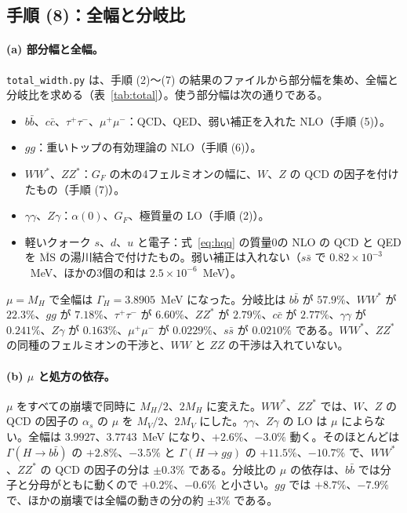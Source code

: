 \documentclass[a4paper,10pt]{ltjsarticle}
\newcommand{\MSbar}{\overline{\mathrm{MS}}}
\begin{document}
\subsection{手順 (8)：全幅と分岐比}\label{sec:step8}

\paragraph{(a) 部分幅と全幅。}\texttt{total\_width.py} は、手順 (2)〜(7) の結果のファイルから部分幅を集め、全幅と分岐比を求める（表~\ref{tab:total}）。使う部分幅は次の通りである。
\begin{itemize}
\item $b\bar b$、$c\bar c$、$\tau^+\tau^-$、$\mu^+\mu^-$：QCD、QED、弱い補正を入れた NLO（手順 (5)）。
\item $gg$：重いトップの有効理論の NLO（手順 (6)）。
\item $WW^*$、$ZZ^*$：$G_F$ の木の4フェルミオンの幅に、$W$、$Z$ の QCD の因子を付けたもの（手順 (7)）。
\item $\gamma\gamma$、$Z\gamma$：$\alpha(0)$、$G_F$、極質量の LO（手順 (2)）。
\item 軽いクォーク $s$、$d$、$u$ と電子：式~\eqref{eq:hqq} の質量0の NLO の QCD と QED を $\MSbar$ の湯川結合で付けたもの。弱い補正は入れない（$s\bar s$ で $0.82\times10^{-3}$~MeV、ほかの3個の和は $2.5\times10^{-6}$~MeV）。
\end{itemize}
$\mu=M_H$ で全幅は $\Gamma_H=3.8905$~MeV になった。分岐比は $b\bar b$ が $57.9\%$、$WW^*$ が $22.3\%$、$gg$ が $7.18\%$、$\tau^+\tau^-$ が $6.60\%$、$ZZ^*$ が $2.79\%$、$c\bar c$ が $2.77\%$、$\gamma\gamma$ が $0.241\%$、$Z\gamma$ が $0.163\%$、$\mu^+\mu^-$ が $0.0229\%$、$s\bar s$ が $0.0210\%$ である。$WW^*$、$ZZ^*$ の同種のフェルミオンの干渉と、$WW$ と $ZZ$ の干渉は入れていない。

\paragraph{(b) $\mu$ と処方の依存。}$\mu$ をすべての崩壊で同時に $M_H/2$、$2M_H$ に変えた。$WW^*$、$ZZ^*$ では、$W$、$Z$ の QCD の因子の $\alpha_s$ の $\mu$ を $M_V/2$、$2M_V$ にした。$\gamma\gamma$、$Z\gamma$ の LO は $\mu$ によらない。全幅は $3.9927$、$3.7743$~MeV になり、$+2.6\%$、$-3.0\%$ 動く。そのほとんどは $\Gamma(H\to b\bar b)$ の $+2.8\%$、$-3.5\%$ と $\Gamma(H\to gg)$ の $+11.5\%$、$-10.7\%$ で、$WW^*$、$ZZ^*$ の QCD の因子の分は $\pm0.3\%$ である。分岐比の $\mu$ の依存は、$b\bar b$ では分子と分母がともに動くので $+0.2\%$、$-0.6\%$ と小さい。$gg$ では $+8.7\%$、$-7.9\%$ で、ほかの崩壊では全幅の動きの分の約 $\pm3\%$ である。
\end{document}
